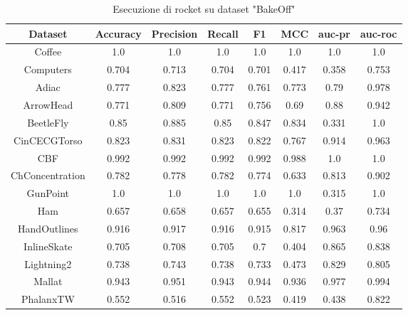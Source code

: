 \begin{table}[h!]
    \centering
    \begin{adjustbox}{max width=\textwidth}
        \begin{tabular}{|c|c|c|c|c|c|c|c|}
        \hline
             \textbf{Dataset} & \textbf{Accuracy} &\textbf{Precision}  & \textbf{Recall} & \textbf{F1} & \textbf{MCC} & \textbf{auc-pr} & \textbf{auc-roc}\\
            \hline
            Coffee &1.0&1.0 & 1.0& 1.0& 1.0& 1.0& 1.0\\
             \hline
             Computers& 0.704& 0.713& 0.704& 0.701& 0.417& 0.358& 0.753\\
             \hline
             Adiac&0.777 &0.823 &0.777 &0.761 & 0.773& 0.79& 0.978\\
             \hline
             ArrowHead&0.771 &0.809 &0.771 &0.756 &0.69 &0.88 &0.942 \\
             \hline
             BeetleFly&0.85 &0.885 &0.85 &0.847 &0.834 &0.331 &1.0 \\
             \hline
             CinCECGTorso& 0.823& 0.831& 0.823& 0.822& 0.767& 0.914& 0.963\\
             \hline
             CBF& 0.992& 0.992& 0.992& 0.992&0.988 &1.0 &1.0 \\
             \hline
             ChConcentration&0.782 &0.778 &0.782 &0.774 &0.633 &0.813 &0.902 \\
             \hline
             GunPoint&1.0 &1.0 &1.0 &1.0 &1.0 & 0.315&1.0 \\
             \hline
             Ham&0.657 &0.658 &0.657 &0.655 &0.314 &0.37 &0.734 \\
             \hline
             HandOutlines&0.916 &0.917 & 0.916&0.915 & 0.817&0.963 &0.96 \\
             \hline
             InlineSkate&0.705 &0.708 & 0.705&0.7 & 0.404&0.865 &0.838 \\
             \hline
             Lightning2&0.738 &0.743 & 0.738&0.733 & 0.473&0.829 &0.805 \\
             \hline
             Mallat&0.943 &0.951 & 0.943&0.944 & 0.936&0.977 &0.994 \\
             \hline
             PhalanxTW& 0.552 &0.516 & 0.552&0.523 & 0.419&0.438 &0.822 \\
             \hline
        \end{tabular}
    \end{adjustbox}
    \label{tab:Rocket_paper}
    \caption{Esecuzione di rocket su dataset "BakeOff"}
\end{table}